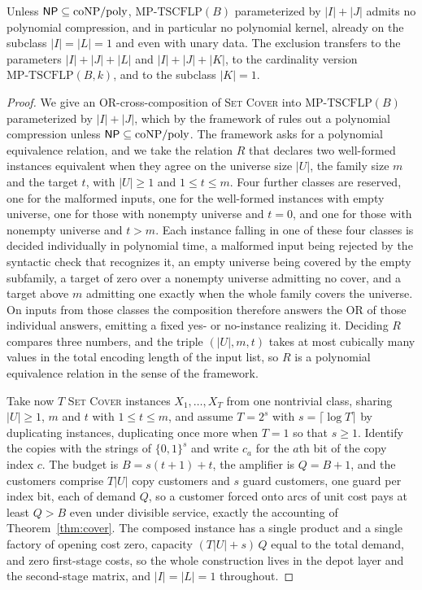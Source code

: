 \begin{theorem}\label{thm:nokernel}
Unless $\textsf{NP}\subseteq\mathrm{coNP}/\mathrm{poly}$,
$\mathrm{MP\text{-}TSCFLP}(B)$ parameterized by $|I|+|J|$ admits no
polynomial compression, and in particular no polynomial kernel, already on
the subclass $|I|=|L|=1$ and even with unary data. The exclusion transfers
to the parameters $|I|+|J|+|L|$ and $|I|+|J|+|K|$, to the cardinality
version $\mathrm{MP\text{-}TSCFLP}(B,k)$, and to the subclass $|K|=1$.
\end{theorem}
\begin{proof}
We give an OR-cross-composition of \textsc{Set Cover} \citep{Karp1972}
into $\mathrm{MP\text{-}TSCFLP}(B)$ parameterized by $|I|+|J|$, which by
the framework of \citet{BodlaenderJansenKratsch2014} rules out a
polynomial compression unless $\textsf{NP}\subseteq\mathrm{coNP}/\mathrm{poly}$.
The framework asks for a polynomial equivalence relation, and we take
the relation $R$ that declares two well-formed instances equivalent when
they agree on the universe size $|U|$, the family size $m$ and the
target $t$, with $|U|\ge 1$ and $1\le t\le m$. Four further classes are
reserved, one for the malformed inputs, one for the well-formed
instances with empty universe, one for those with nonempty universe and
$t=0$, and one for those with nonempty universe and $t>m$.
Each instance falling in one of these four classes is decided
individually in polynomial time, a malformed input being rejected by
the syntactic check that recognizes it, an empty universe being covered
by the empty subfamily, a target of zero over a nonempty universe
admitting no cover, and a target above $m$ admitting one exactly when
the whole family covers the universe. On inputs from those classes the composition
therefore answers the OR of those individual answers, emitting a fixed
yes- or no-instance realizing it. Deciding $R$ compares three numbers, and
the triple $(|U|,m,t)$ takes at most cubically many values in the total
encoding length of the input list, so
$R$ is a polynomial equivalence relation in the sense of the framework.

Take now $T$ \textsc{Set Cover} instances $X_1,\dots,X_T$ from one
nontrivial class, sharing $|U|\ge 1$, $m$ and $t$ with $1\le t\le m$,
and assume
$T=2^{s}$ with $s=\lceil\log T\rceil$ by duplicating instances,
duplicating once more when $T=1$ so that $s\ge 1$. Identify the copies
with the strings of $\{0,1\}^{s}$ and write $c_a$ for the $a$th bit of
the copy index $c$. The budget is $B=s(t+1)+t$, the amplifier is
$Q=B+1$, and the customers comprise $T|U|$ copy customers and $s$ guard
customers, one guard per index bit, each of demand $Q$, so a customer
forced onto arcs of unit cost pays at least $Q>B$ even under divisible
service, exactly the accounting of Theorem~\ref{thm:cover}. The
composed instance has a single product and a single factory of opening
cost zero, capacity $(T|U|+s)\,Q$ equal to the total demand, and zero
first-stage costs, so the whole construction lives in the depot layer
and the second-stage matrix, and $|I|=|L|=1$ throughout.


\end{proof}
